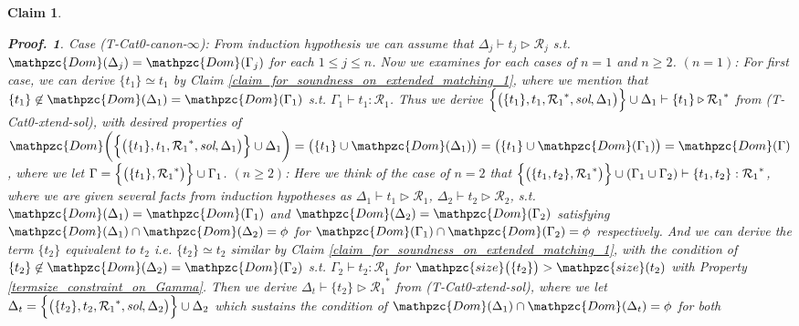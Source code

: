 \documentclass[12pt]{article}
\newtheorem{Claim}{Claim}[section]
\newtheorem{Proof}{Proof.}
\begin{document}
\begin{Claim}
\begin{Proof}
    Case (T-Cat0-canon-$\infty$): From induction hypothesis we can assume
    that $\Delta_j \vdash t_j \triangleright \mathcal{R}_j$ s.t.
    $\mathpzc{Dom}(\Delta_j) = \mathpzc{Dom}(\Gamma_j)$ for each
    $1 \le j \le n$. Now we examines for each cases of
    $n = 1$ and $n \ge 2$.
    $(n = 1)$: For first case, we can derive $\{t_1\} \simeq t_1$ by
    Claim \ref{claim_for_soundness_on_extended_matching_1}, where
    we mention that
    $\{t_1\} \not\in \mathpzc{Dom}(\Delta_1) = \mathpzc{Dom}(\Gamma_1)$
    s.t. $\Gamma_1 \vdash t_1 : \mathcal{R}_1$. Thus we derive    
    $\Bigl\{\bigl(\{t_1\}, t_1, {\mathcal{R}_1}^*, \text{\it sol}, \Delta_1
    \bigr) \Bigr\} \cup \Delta_1 \vdash \{t_1\}
    \triangleright {\mathcal{R}_1}^*$ from (T-Cat0-xtend-sol),
    with desired properties of
    $\mathpzc{Dom}\biggl(\Bigl\{\bigl(\{t_1\}, t_1, {\mathcal{R}_1}^*,
    \text{\it sol}, \Delta_1 \bigr) \Bigr\} \cup \Delta_1 \biggr) =
    \bigl(\{t_1\} \cup \mathpzc{Dom}(\Delta_1) \bigr) =
    \bigl(\{t_1\} \cup \mathpzc{Dom}(\Gamma_1) \bigr) =
    \mathpzc{Dom}(\Gamma)$, where we let
    $\Gamma = \Bigl\{\bigl(\{t_1\}, {\mathcal{R}_1}^* \bigr) \Bigr\} \cup
    \Gamma_1$.
    $(n \ge 2)$: Here we think of the case of $n = 2$ that
    $\Bigl\{\bigl(\{t_1, t_2\}, {\mathcal{R}_1}^*\bigr) \Bigr\} \cup
    (\Gamma_1 \cup \Gamma_2) \vdash \{t_1, t_2\} : {\mathcal{R}_1}^*$,
    where we are given several facts from induction hypotheses as
    $\Delta_1 \vdash t_1 \triangleright \mathcal{R}_1$,
    $\Delta_2 \vdash t_2 \triangleright \mathcal{R}_2$, s.t.
    $\mathpzc{Dom}(\Delta_1) = \mathpzc{Dom}(\Gamma_1)$ and
    $\mathpzc{Dom}(\Delta_2) = \mathpzc{Dom}(\Gamma_2)$ satisfying
    $\mathpzc{Dom}(\Delta_1) \cap \mathpzc{Dom}(\Delta_2) = \phi$ for
    $\mathpzc{Dom}(\Gamma_1) \cap \mathpzc{Dom}(\Gamma_2) = \phi$
    respectively.
    And we can derive the term $\{t_2\}$ equivalent to $t_2$ i.e.
    $\{t_2\} \simeq t_2$ similar by
    Claim \ref{claim_for_soundness_on_extended_matching_1}, with
    the condition of
    $\{t_2\} \not\in \mathpzc{Dom}(\Delta_2) = \mathpzc{Dom}(\Gamma_2)$
    s.t. $\Gamma_2 \vdash t_2 : \mathcal{R}_1$ for
    $\mathpzc{size}\bigl(\{t_2\} \bigr) > \mathpzc{size}(t_2)$ with
    Property \ref{termsize_constraint_on_Gamma}. Then we derive
    $\Delta_t \vdash \{t_2\} \triangleright {\mathcal{R}_1}^*$ from
    (T-Cat0-xtend-sol), where we let
    $\Delta_t = \Bigl\{\bigl(\{t_2\}, t_2, {\mathcal{R}_1}^*,
    \text{\it sol},\Delta_2 \bigr) \Bigr\} \cup \Delta_2$ which sustains
    the condition of
    $\mathpzc{Dom}(\Delta_1) \cap \mathpzc{Dom}(\Delta_t) = \phi$ for both

\end{Proof}
\end{Claim}
\end{document}
